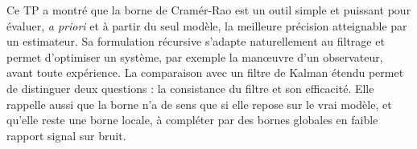 \documentclass[11pt,a4paper]{article}
\theoremstyle{remark}
\begin{document}
Ce TP a montré que la borne de Cramér-Rao est un outil simple et puissant pour évaluer, \emph{a priori} et à partir du seul modèle, la meilleure précision atteignable par un estimateur.
Sa formulation récursive s'adapte naturellement au filtrage et permet d'optimiser un système, par exemple la manœuvre d'un observateur, avant toute expérience.
La comparaison avec un filtre de Kalman étendu permet de distinguer deux questions : la consistance du filtre et son efficacité.
Elle rappelle aussi que la borne n'a de sens que si elle repose sur le vrai modèle, et qu'elle reste une borne locale, à compléter par des bornes globales en faible rapport signal sur bruit.
\end{document}
